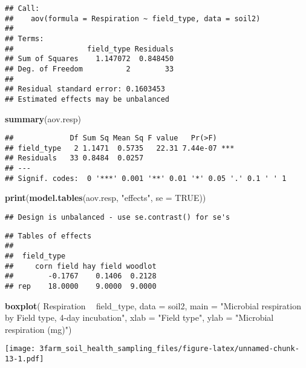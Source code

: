 \documentclass[]{article}
\newenvironment{Shaded}{\begin{snugshade}}{\end{snugshade}}
\newcommand{\KeywordTok}[1]{\textcolor[rgb]{0.13,0.29,0.53}{\textbf{#1}}}
\newcommand{\DataTypeTok}[1]{\textcolor[rgb]{0.13,0.29,0.53}{#1}}
\newcommand{\StringTok}[1]{\textcolor[rgb]{0.31,0.60,0.02}{#1}}
\newcommand{\OtherTok}[1]{\textcolor[rgb]{0.56,0.35,0.01}{#1}}
\newcommand{\OperatorTok}[1]{\textcolor[rgb]{0.81,0.36,0.00}{\textbf{#1}}}
\newcommand{\NormalTok}[1]{#1}
\begin{document}
\begin{verbatim}
## Call:
##    aov(formula = Respiration ~ field_type, data = soil2)
## 
## Terms:
##                 field_type Residuals
## Sum of Squares    1.147072  0.848450
## Deg. of Freedom          2        33
## 
## Residual standard error: 0.1603453
## Estimated effects may be unbalanced
\end{verbatim}

\begin{Shaded}
\begin{Highlighting}[]
\KeywordTok{summary}\NormalTok{(aov.resp)}
\end{Highlighting}
\end{Shaded}

\begin{verbatim}
##             Df Sum Sq Mean Sq F value   Pr(>F)    
## field_type   2 1.1471  0.5735   22.31 7.44e-07 ***
## Residuals   33 0.8484  0.0257                     
## ---
## Signif. codes:  0 '***' 0.001 '**' 0.01 '*' 0.05 '.' 0.1 ' ' 1
\end{verbatim}

\begin{Shaded}
\begin{Highlighting}[]
\KeywordTok{print}\NormalTok{(}\KeywordTok{model.tables}\NormalTok{(aov.resp, }\StringTok{"effects"}\NormalTok{, }\DataTypeTok{se =} \OtherTok{TRUE}\NormalTok{))}
\end{Highlighting}
\end{Shaded}

\begin{verbatim}
## Design is unbalanced - use se.contrast() for se's
\end{verbatim}

\begin{verbatim}
## Tables of effects
## 
##  field_type 
##     corn field hay field woodlot
##        -0.1767    0.1406  0.2128
## rep    18.0000    9.0000  9.0000
\end{verbatim}

\begin{Shaded}
\begin{Highlighting}[]
\KeywordTok{boxplot}\NormalTok{( Respiration }\OperatorTok{~}\StringTok{ }\NormalTok{field_type, }\DataTypeTok{data =}\NormalTok{ soil2, }\DataTypeTok{main =} \StringTok{"Microbial respiration by Field type, 4-day incubation"}\NormalTok{, }\DataTypeTok{xlab =} \StringTok{"Field type"}\NormalTok{, }\DataTypeTok{ylab =} \StringTok{"Microbial respiration (mg)"}\NormalTok{)}
\end{Highlighting}
\end{Shaded}

\texttt{[image: 3farm\_soil\_health\_sampling\_files/figure-latex/unnamed-chunk-13-1.pdf]}
\end{document}
